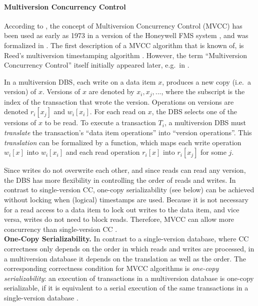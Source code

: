 \paragraph{Multiversion Concurrency Control}
According to \cite{Sil82}, the concept of Multiversion Concurrency Control (MVCC) has been used as early as 1973 in a version of the Honeywell FMS system \cite{Hon73}, and was formalized in \cite{SLR76}. The first description of a MVCC algorithm that is known of, is Reed's multiversion timestamping algorithm \cite{Ree78}. However, the term ``Multiversion Concurrency Control'' itself initially appeared later, e.g.\ in \cite{Sil82}.

In a multiversion DBS, each write on a data item $x$, produces a new copy (i.e.\ a version) of $x$. Versions of $x$ are denoted by $x_i, x_j, ...$, where the subscript is the index of the transaction that wrote the version. Operations on versions are denoted $r_i[x_j]$ and $w_i[x_i]$. For each read on $x$, the DBS selects one of the versions of $x$ to be read. To execute a transaction $T_i$, a multiversion DBS must \emph{translate} the transaction's ``data item operations'' into ``version operations''. This \emph{translation} can be formalized by a function, which maps each write operation $w_i[x]$ into $w_i[x_i]$ and each read operation $r_i[x]$ into $r_i[x_j]$ for some $j$.

Since writes do not overwrite each other, and since reads can read any version, the DBS has more flexibility in controlling the order of reads and writes. In contrast to single-version CC, one-copy serializability (see below) can be achieved without locking when (logical) timestamps are used. Because it is not necessary for a read access to a data item to lock out writes to the data item, and vice versa, writes do not need to block reads. Therefore, MVCC can allow more concurrency than single-version CC \cite[p.~158]{Ree78} \cite{BG83}.\\

\noindent
{\bf One-Copy Serializability.}
In contrast to a single-version database, where CC correctness only depends on the order in which reads and writes are processed, in a multiversion database it depends on the translation as well as the order. The corresponding correctness condition for MVCC algorithms is \emph{one-copy serializability}: an execution of transactions in a multiversion database is one-copy serializable, if it is equivalent to a serial execution of the same transactions in a single-version database \cite{BG83}.\\

